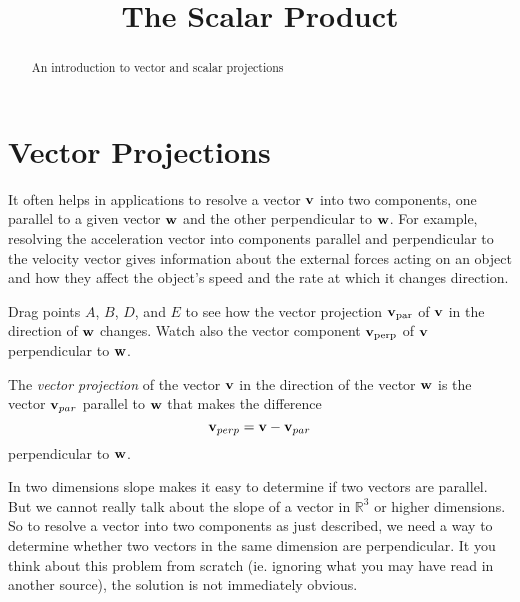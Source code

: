 \documentclass{ximera}
\title{The Scalar Product}
\begin{document}
\begin{abstract}
An introduction to vector and scalar projections
\end{abstract}
\maketitle

\section{Vector Projections}

It often helps in applications to resolve a vector ${\bf v}$ into two components, one parallel to a given vector ${\bf w}$ and the other perpendicular to ${\bf w}$. For example, resolving the acceleration vector into components parallel and perpendicular to the velocity vector gives information about the external forces acting on an object and how they affect the object's speed and the rate at which it changes direction.


\begin{exploration}
Drag points $A$, $B$, $D$, and $E$ to see how the vector projection ${\bf v}_{\text{par}}$ of ${\bf v}$ in the direction of ${\bf w}$ changes. Watch also the vector component ${\bf v}_{\text{perp}}$ of ${\bf v}$ perpendicular to ${\bf w}$.


 
\begin{onlineOnly}
    \begin{center}
\end{center}
\end{onlineOnly}
\end{exploration}





The \emph{vector projection} of the vector ${\bf v}$ in the direction of the vector ${\bf w}$ is the vector ${\bf v}_{par}$ parallel to ${\bf w}$ that makes the difference
\[
      {\bf v}_{perp} = {\bf v} - {\bf v}_{par}
\]
perpendicular to ${\bf w}$.

In two dimensions slope makes it easy to determine if two vectors are parallel. But we cannot really talk about the slope of a vector in $\mathbb{R}^3$ or higher dimensions. So to resolve a vector into two components as just described, we need a way to determine whether two vectors in the same dimension are perpendicular. It you think about this problem from scratch (ie. ignoring what you may have read in another source), the solution is not immediately obvious.
\end{document}
